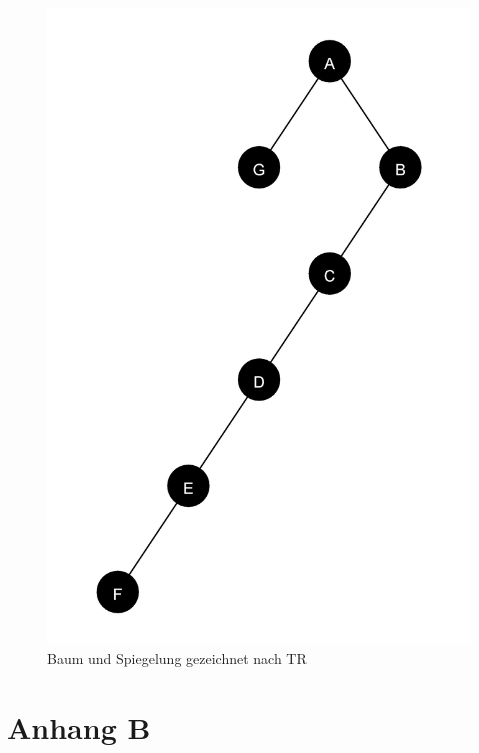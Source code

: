 \begin{figure}[ht]
\begin{minipage}[t]{0.45\linewidth}
        \includegraphics[scale = 0.06]{abbildungen/tree_spiegel_2_a3}   
    \end{minipage}  
    \caption[]{Baum und Spiegelung gezeichnet nach TR}
    \label{pic:TR_Spiegel}
\end{figure}

\chapter{Anhang B}
\label{chap:anhang_b}







